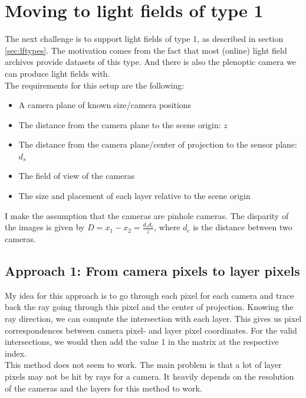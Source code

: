 \documentclass[11pt,a4paper,titlepage]{article}
\begin{document}
\section{Moving to light fields of type 1}
The next challenge is to support light fields of type 1, as described in section \ref{sec:lftypes}. The motivation comes from the fact that most (online) light field archives provide datasets of this type. And there is also the plenoptic camera we can produce light fields with. 
\\
The requirements for this setup are the following:

\begin{itemize}
	\item A camera plane of known size/camera positions
	\item The distance from the camera plane to the scene origin: $z$
	\item The distance from the camera plane/center of projection to the sensor plane: $d_s$
	\item The field of view of the cameras
	\item The size and placement of each layer relative to the scene origin
\end{itemize}

I make the assumption that the cameras are pinhole cameras. The disparity of the images is given by $D = x_1 - x_2 = \frac{d_s d_c}{z}$, where $d_c$ is the distance between two cameras.

\subsection{Approach 1: From camera pixels to layer pixels}
My idea for this approach is to go through each pixel for each camera and trace back the ray going through this pixel and the center of projection. Knowing the ray direction, we can compute the intersection with each layer. This gives us pixel correspondences between camera pixel- and layer pixel coordinates. For the valid intersections, we would then add the value 1 in the matrix at the respective index. 
\\
This method does not seem to work. The main problem is that a lot of layer pixels may not be hit by rays for a camera. It heavily depends on the resolution of the cameras and the layers for this method to work.
\end{document}
